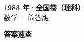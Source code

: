 \documentclass[zihao=-4, a4paper]{ctexart}
\begin{document}
\begin{center}
  {\Large\bfseries 1983 年·全国卷（理科）}\\[4pt]
  {\large 数学 · 简答版}
\end{center}
\medskip
{}

\clearpage
{}
\begin{center}{\Large\bfseries 答案速查}\end{center}
\medskip

\end{document}
